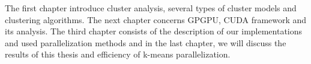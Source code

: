 

The first chapter introduce cluster analysis, several types of cluster models and clustering algorithms. The next chapter concerns GPGPU, CUDA framework and its analysis. The third chapter consists of the description of our implementations and used parallelization methods and in the last chapter, we will discuss the results of this thesis and efficiency of k-means parallelization. 